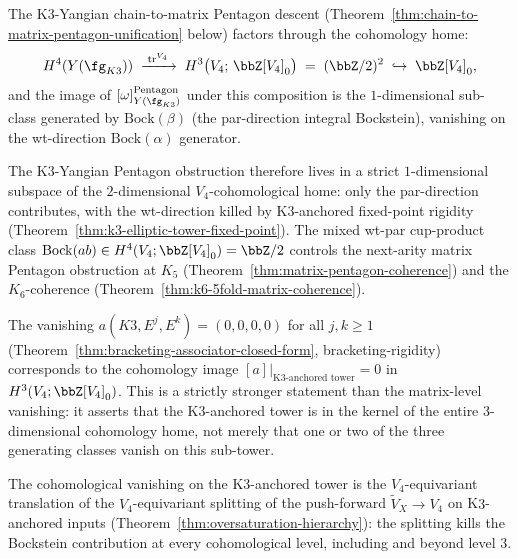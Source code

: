 \begin{corollary}
\label{cor:K3-Yangian-Pentagon-cohomology-projection}
The K$3$-Yangian chain-to-matrix Pentagon descent
\textup{(}Theorem~\ref{thm:chain-to-matrix-pentagon-unification} below\textup{)}
factors through the cohomology home:
\[
 H^4(Y(\fg_{K3})) \;\xrightarrow{\;\mathrm{tr}^{V_4}\;}\;
 H^3\bigl(V_4;\, \bbZ[V_4]_0\bigr) \;=\; (\bbZ/2)^2
 \;\hookrightarrow\; \bbZ[V_4]_0,
\]
and the image of $[\omega]^{\mathrm{Pentagon}}_{Y(\fg_{K3})}$ under this
composition is the $1$-dimensional sub-class generated by
$\mathrm{Bock}(\beta)$ \textup{(}the par-direction integral Bockstein\textup{)},
vanishing on the wt-direction $\mathrm{Bock}(\alpha)$ generator.

The K$3$-Yangian Pentagon obstruction therefore lives in a strict
$1$-dimensional subspace of the $2$-dimensional $V_4$-cohomological home:
only the par-direction contributes, with the wt-direction killed by
K$3$-anchored fixed-point rigidity \textup{(}Theorem~\ref{thm:k3-elliptic-tower-fixed-point}\textup{).}
The mixed wt-par cup-product class $\mathrm{Bock}(ab) \in H^4(V_4; \bbZ[V_4]_0)
= \bbZ/2$ controls the next-arity matrix Pentagon obstruction at $K_5$
\textup{(}Theorem~\ref{thm:matrix-pentagon-coherence}\textup{)} and the
$K_6$-coherence
\textup{(}Theorem~\ref{thm:k6-5fold-matrix-coherence}\textup{).}
\end{corollary}

\begin{remark}
\label{rem:bracketing-rigidity-cohomological}
The vanishing $a(K3, E^j, E^k) = (0, 0, 0, 0)$ for all $j, k \geq 1$
\textup{(}Theorem~\ref{thm:bracketing-associator-closed-form},
bracketing-rigidity\textup{)} corresponds to the cohomology image
$[a]|_{\text{K$3$-anchored tower}} = 0$ in $H^3(V_4; \bbZ[V_4]_0)$. This
is a strictly stronger statement than the matrix-level vanishing: it
asserts that the K$3$-anchored tower is in the kernel of the entire
3-dimensional cohomology home, not merely that one or two of the three
generating classes vanish on this sub-tower.

The cohomological vanishing on the K$3$-anchored tower is the
$V_4$-equivariant translation of the $V_4$-equivariant splitting of the
push-forward $\widetilde{V}_X \to V_4$ on K$3$-anchored inputs
\textup{(}Theorem~\ref{thm:oversaturation-hierarchy}\textup{):} the
splitting kills the Bockstein contribution at every cohomological level,
including and beyond level $3$.
\end{remark}


